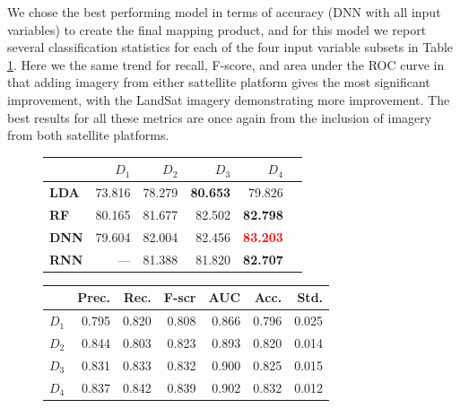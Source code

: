 \def\year{2017}\relax \documentclass[letterpaper]{article}
\begin{document}
We chose the best performing model in terms of accuracy (DNN with all input variables) to create the final mapping product, and for this model we report several classification statistics for each of the four input variable subsets in Table \ref{tab:dnnperf}. Here we the same trend for recall, F-score, and area under the ROC curve in that adding imagery from either sattellite platform gives the most significant improvement, with the LandSat imagery demonstrating more improvement. The best results for all these metrics are once again from the inclusion of imagery from both satellite platforms. 
  \begin{figure}
  \begin{minipage}[b]{0.49\textwidth}
    \centering
 \begin{tabularx}{\linewidth}{l r r r r r}
		\toprule[.2em]
		 &$D_1$& $D_2$&$D_3$&$D_4$\\
		\midrule
		{\bf LDA}&73.816 & 78.279&{\bf 80.653} &79.826\\
		{\bf RF}&80.165 &81.677&82.502 &{\bf 82.798}\\
		{\bf DNN}&79.604& 82.004&82.456 &\textcolor{red}{\bf 83.203}\\
		{\bf RNN}&--- & 81.388&81.820 &{\bf 82.707}\\
		\bottomrule[.2em]
	\end{tabularx}
	 \label{tab:perf2}
    \end{minipage}
\hfill
  \begin{minipage}[b]{0.49\textwidth}
    \centering
\begin{tabularx}{\linewidth}{l r r r r r r}
		\toprule[.2em]
		 &{\bf Prec.}& {\bf Rec.}&{\bf F-scr}&{\bf AUC}&{\bf Acc.}&{\bf Std.}\\
		\midrule
		$D_1$&0.795& 0.820&0.808 &0.866&0.796&0.025\\
		$D_2$&0.844 &0.803&0.823 &0.893&0.820&0.014\\
		$D_3$&0.831& 0.833&0.832 &0.900&0.825&0.015\\
		$D_4$&0.837& 0.842&0.839 &0.902&0.832&0.012\\
		\bottomrule[.2em]
	\end{tabularx}
	 \label{tab:dnnperf}
  \end{minipage}
 

\end{figure}
\end{document}
